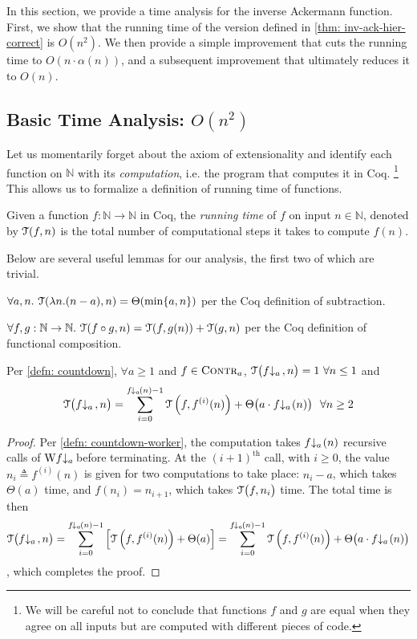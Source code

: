 In this section, we provide a time analysis for the 
inverse Ackermann function. First, we show that the 
running time of the version defined in \cref{thm: inv-ack-hier-correct}
is $O(n^2)$. We then provide a simple improvement that 
cuts the running time to $O(n\cdot\alpha(n))$, and 
a subsequent improvement that ultimately reduces it to $O(n)$.

\subsection{Basic Time Analysis: $O(n^2)$}
Let us momentarily forget about the axiom of extensionality and identify each 
function on $\mathbb{N}$ with its \emph{computation}, i.e. the program that 
computes it in Coq.
\footnote{We will be careful not to conclude that functions 
$f$ and $g$ are equal when they agree on all inputs but are computed with 
different pieces of code.} This allows us to formalize a definition of 
running time of functions.
\begin{defn}
	Given a function $f:\mathbb{N}\to\mathbb{N}$ in Coq, the \emph{running time} of $f$ on input $n\in \mathbb{N}$, denoted by $\mathcal{T}(f, n)$ is the total number of computational steps it takes to compute $f(n)$.
\end{defn}
Below are several useful lemmas for our analysis, the first two of which are trivial.
\begin{lem} \label{lem: sub-runtime}
	$\forall a, n.~ \mathcal{T}(\lambda n.(n - a), n) = \Theta(\min\{a, n\})$ per the Coq definition of subtraction.
\end{lem}
\begin{lem} \label{lem: compose-runtime}
	$\forall f, g: \mathbb{N}\to \mathbb{N}.~\mathcal{T}(f\circ g, n) = \mathcal{T}(f, g(n)) + \mathcal{T}(g, n)$ per the Coq definition of functional composition. 
\end{lem}
\begin{lem} \label{lem: cdt-runtime}
	Per \cref{defn: countdown}, $\forall a\ge 1$ and $f\in \text{\scshape{Contr}}_{a}$, $\runtime\big(\cdt{f}{a}\ , n\big) = 1 \ \forall n\le 1$ and
	\begin{equation*}
	\runtime\big(\cdt{f}{a}\ , n\big) = \sum_{i=0}^{\cdt{f}{a}(n) - 1} \runtime\left(f, f^{(i)}(n)\right) + \Theta\big(a\cdot \cdt{f}{a}(n)\big) \ \ \forall n\ge 2
	\end{equation*}
\end{lem}
\begin{proof}
	Per \cref{defn: countdown-worker}, the computation takes $\cdt{f}{a}(n)$ recursive calls of $\W\cdt{f}{a}$ before terminating. At the $(i+1)^{\text{th}}$ call, with $i\ge 0$, the value $n_i \triangleq f^{(i)}(n)$ is given for two computations to take place: $n_i - a$, which takes $\Theta(a)$ time, and $f(n_i) = n_{i+1}$, which takes $\mathcal{T}\big(f, n_i\big)$ time. The total time is then
	\begin{equation*}
	\runtime\big(\cdt{f}{a}\ , n\big)
	= \sum_{i=0}^{\cdt{f}{a}(n) - 1} \left[\runtime\left(f, f^{(i)}(n)\right) + \Theta(a)\right]
	= \sum_{i=0}^{\cdt{f}{a}(n) - 1} \runtime\left(f, f^{(i)}(n)\right) + \Theta\big(a\cdot \cdt{f}{a}(n)\big)
	\end{equation*}
	, which completes the proof.
\end{proof}
